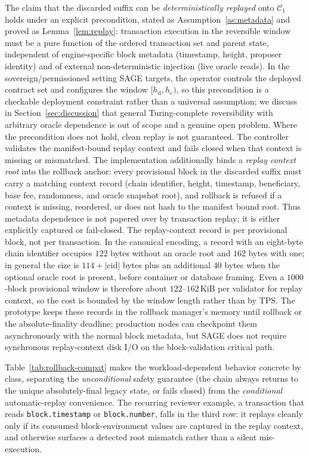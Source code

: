 \documentclass[journal]{IEEEtran}
\theoremstyle{definition}
\theoremstyle{remark}
\begin{document}
The claim that the discarded suffix can be \emph{deterministically replayed} onto $\mathcal{C}_1$
holds under an explicit precondition, stated as Assumption~\ref{as:metadata} and proved as
Lemma~\ref{lem:replay}: transaction execution in the reversible window must be a pure function of
the ordered transaction set and parent state, independent of engine-specific block metadata
(timestamp, height, proposer identity) and of external non-deterministic injection (live oracle
reads). In the sovereign/permissioned setting SAGE targets, the operator controls the deployed
contract set and configures the window $[h_{\mathrm{d}}, h_{\mathrm{c}})$, so this precondition is a
checkable deployment constraint rather than a universal assumption; we discuss in
Section~\ref{sec:discussion} that general Turing-complete reversibility with arbitrary oracle
dependence is out of scope and a genuine open problem. Where the precondition does not hold, clean replay is not guaranteed. The controller validates the
manifest-bound replay context and fails closed when that context is missing or mismatched. The implementation additionally binds a \emph{replay context root} into the
rollback anchor: every provisional block in the discarded suffix must carry a matching context
record (chain identifier, height, timestamp, beneficiary, base fee, randomness, and oracle snapshot
root), and rollback is refused if a context is missing, reordered, or does not hash to the manifest
bound root. Thus metadata dependence is not papered over by transaction replay; it is either
explicitly captured or fail-closed. The replay-context record is per provisional block, not per
transaction. In the canonical encoding, a record with an eight-byte chain identifier
occupies $122$ bytes without an oracle root and $162$ bytes with one; in general
the size is $114+|\mathrm{cid}|$ bytes plus an additional $40$ bytes when the optional oracle root
is present, before container or database framing. Even a $1000$-block provisional window is
therefore about $122$--$162$\,KiB per validator for replay context, so the cost is bounded by the
window length rather than by TPS. The prototype keeps these records in the rollback manager's
memory until rollback or the absolute-finality deadline; production nodes can checkpoint them
asynchronously with the normal block metadata, but SAGE does not require synchronous replay-context
disk I/O on the block-validation critical path.

Table~\ref{tab:rollback-compat} makes the workload-dependent behavior concrete by
class, separating the \emph{unconditional} safety guarantee (the chain always returns to the
unique absolutely-final legacy state, or fails closed) from the \emph{conditional} automatic-replay
convenience. The recurring reviewer example, a transaction that reads \texttt{block.timestamp} or
\texttt{block.number}, falls in the third row: it replays cleanly only if its consumed
block-environment values are captured in the replay context, and otherwise surfaces a detected root
mismatch rather than a silent mis-execution.
\end{document}
